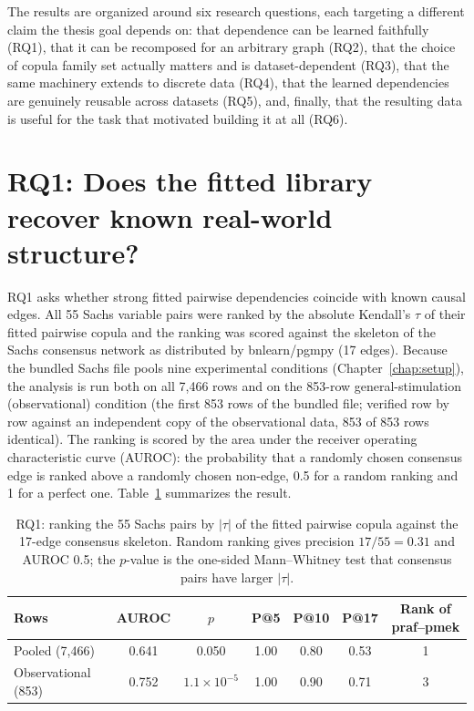 \documentclass[
  english,
  class=report,
  accentcolor=2c,
  marginpar=false,
  parskip=half-,
  fontsize=11pt,
  ruledheaders=false,
  pdfa=false,
  IMRAD=false,
  thesis={type=master}
]{tudapub}
\begin{document}
The results are organized around six research questions, each targeting a
different claim the thesis goal depends on: that dependence can be learned
faithfully (RQ1), that it can be recomposed for an arbitrary graph (RQ2),
that the choice of copula family set actually matters and is
dataset-dependent (RQ3), that the same machinery extends to discrete data
(RQ4), that the learned dependencies are genuinely reusable across datasets
(RQ5), and, finally, that the resulting data is useful for the task that
motivated building it at all (RQ6).

\section{RQ1: Does the fitted library recover known real-world structure?}
\label{sec:rq1}
RQ1 asks whether strong fitted pairwise dependencies coincide with known
causal edges. All 55 Sachs variable pairs were ranked by the absolute
Kendall's $\tau$ of their fitted pairwise copula and the ranking was scored
against the skeleton of the Sachs consensus network as distributed by
bnlearn/pgmpy (17 edges). Because the bundled Sachs file pools nine
experimental conditions (Chapter~\ref{chap:setup}), the analysis is run both
on all 7,466 rows and on the 853-row general-stimulation (observational)
condition (the first 853 rows of the bundled file; verified row by row
against an independent copy of the observational data, 853 of 853 rows
identical). The ranking is scored by the area under the receiver operating
characteristic curve (AUROC): the probability that a randomly chosen
consensus edge is ranked above a randomly chosen non-edge, 0.5 for a random
ranking and 1 for a perfect one. Table~\ref{tab:rq1} summarizes the result.

\begin{table}[ht]
\caption{RQ1: ranking the 55 Sachs pairs by $|\tau|$ of the fitted pairwise copula against the 17-edge consensus skeleton. Random ranking gives precision $17/55 = 0.31$ and AUROC 0.5; the $p$-value is the one-sided Mann--Whitney test that consensus pairs have larger $|\tau|$.}
\label{tab:rq1}
\centering
\begin{tabular}{lcccccc}
\toprule
\textbf{Rows} & \textbf{AUROC} & \textbf{$p$} & \textbf{P@5} & \textbf{P@10} & \textbf{P@17} & \textbf{Rank of praf--pmek} \\
\midrule
Pooled (7,466) & 0.641 & 0.050 & 1.00 & 0.80 & 0.53 & 1 \\
Observational (853) & 0.752 & $1.1\times10^{-5}$ & 1.00 & 0.90 & 0.71 & 3 \\
\bottomrule
\end{tabular}
\end{table}
\end{document}
